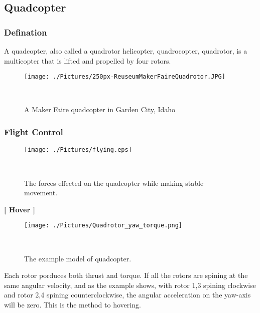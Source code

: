 \subsection{Quadcopter}
\subsubsection{Defination}
A quadcopter, also called a quadrotor helicopter, quadrocopter, quadrotor, is a multicopter that is lifted and propelled by four rotors.\cite{wikipedia1}
\begin{figure}[h!]
  
  \centering
    \texttt{[image: ./Pictures/250px-ReuseumMakerFaireQuadrotor.JPG]}
    \caption{A Maker Faire quadcopter in Garden City, Idaho\cite{cite1}}\\
\end{figure}
\subsubsection{Flight Control}
\begin{figure}[h!]
  
  \centering
    \texttt{[image: ./Pictures/flying.eps]}
    \caption{The forces effected on the quadcopter while making stable movement.}\\
\end{figure}
\textbf{[ Hover ]}
\begin{figure}[H]
  
  \centering
    \texttt{[image: ./Pictures/Quadrotor\_yaw\_torque.png]}
    \caption{The example model of quadcopter.}\\
\end{figure}


Each rotor porduces both thrust and torque. If all the rotors are spining at the same angular velocity, and as the example shows, with rotor 1,3 spining clockwise and rotor 2,4 spining counterclockwise, the angular acceleration on the yaw-axis will be zero. 
This is the method to hovering.

